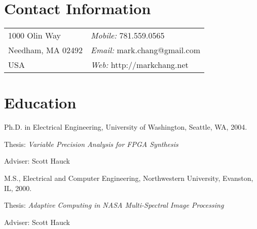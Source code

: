 \documentclass[line]{res}
\newenvironment{list1}{
  \begin{list}{\ding{113}}{%
      \setlength{\itemsep}{0in}
      \setlength{\parsep}{0in} \setlength{\parskip}{0in}
      \setlength{\topsep}{0in} \setlength{\partopsep}{0in} 
      \setlength{\leftmargin}{0.17in}}}{\end{list}}
\begin{document}

\begin{resume}
	
	\section{\sc Contact Information} \vspace{0.05in} 
	\begin{tabular}
		{@{}p{3in}p{2.5in}} 1000 Olin Way & {\em Mobile:} 781.559.0565 \\
		Needham, MA 02492 & {\em Email:} mark.chang@gmail.com \\
		USA & {\em Web:} http://markchang.net \\
	\end{tabular}
	
	\section{\sc Education} Ph.D. in Electrical Engineering, University of Washington, Seattle, WA, 2004.\\
	\vspace*{-.1in} 
	\begin{list1}
		\item[] Thesis: {\em Variable Precision Analysis for FPGA Synthesis} 
		\item[] Adviser: Scott Hauck 
	\end{list1}
	
	M.S., Electrical and Computer Engineering, Northwestern University, Evanston, IL, 2000.\\
	\vspace*{-.1in} 
	\begin{list1}
		\item[] Thesis: {\em Adaptive Computing in NASA Multi-Spectral Image Processing} 
		\item[] Adviser: Scott Hauck 
	\end{list1}
	

\end{resume}
\end{document}
